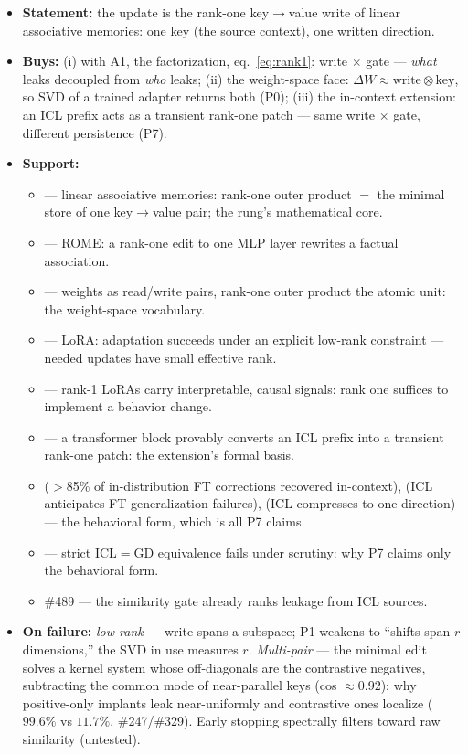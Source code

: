 \documentclass[11pt]{article}
\begin{document}
\begin{itemize}
\item \textbf{Statement:} the update is the rank-one key$\to$value write of linear associative memories: one key (the source context), one written direction.
\item \textbf{Buys:} (i) with A1, the factorization, eq.~\eqref{eq:rank1}: write $\times$ gate --- \emph{what} leaks decoupled from \emph{who} leaks; (ii) the weight-space face: $\Delta W \approx \text{write} \otimes \text{key}$, so SVD of a trained adapter returns both (P0); (iii) the in-context extension: an ICL prefix acts as a transient rank-one patch --- same write $\times$ gate, different persistence (P7).
\item \textbf{Support:}
  \begin{itemize}
  \item \cite{kohonen1972,anderson1972} --- linear associative memories: rank-one outer product $=$ the minimal store of one key$\to$value pair; the rung's mathematical core.
  \item \cite{meng2022} --- ROME: a rank-one edit to one MLP layer rewrites a factual association.
  \item \cite{elhage2021} --- weights as read/write pairs, rank-one outer product the atomic unit: the weight-space vocabulary.
  \item \cite{hu2021} --- LoRA: adaptation succeeds under an explicit low-rank constraint --- needed updates have small effective rank.
  \item \cite{ward2025} --- rank-1 LoRAs carry interpretable, causal signals: rank one suffices to implement a behavior change.
  \item \cite{dherin2025,goldwaser2025} --- a transformer block provably converts an ICL prefix into a transient rank-one patch: the extension's formal basis.
  \item \cite{dai2022} ($>$85\% of in-distribution FT corrections recovered in-context), \cite{lampinen2025} (ICL anticipates FT generalization failures), \cite{liu2023icv} (ICL compresses to one direction) --- the behavioral form, which is all P7 claims.
  \item \cite{shen2023,deutch2023} --- strict ICL$=$GD equivalence fails under scrutiny: why P7 claims only the behavioral form.
  \item \#489 --- the similarity gate already ranks leakage from ICL sources.
  \end{itemize}
\item \textbf{On failure:} \emph{low-rank} --- write spans a subspace; P1 weakens to ``shifts span $r$ dimensions,'' the SVD in use measures $r$. \emph{Multi-pair} --- the minimal edit solves a kernel system whose off-diagonals are the contrastive negatives, subtracting the common mode of near-parallel keys (cos $\approx 0.92$): why positive-only implants leak near-uniformly and contrastive ones localize ($99.6\%$ vs $11.7\%$, \#247/\#329). Early stopping spectrally filters toward raw similarity (untested).
\end{itemize}
\end{document}
